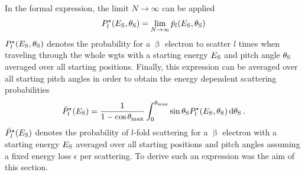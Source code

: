 In the formal expression, the limit $N\rightarrow\infty$ can be applied
\begin{equation}
  P^{\star}_l(E_\mathrm{S},\theta_\mathrm{S}) = 
    \lim_{N\rightarrow\infty} \bar{p}_l(E_\mathrm{S},\theta_\mathrm{S})
    \label{eq:appendixEDepScatCrossSecExtendedModelFormalismPitchAngleDepScatProbs}
\end{equation}
$P^{\star}_l(E_\mathrm{S},\theta_\mathrm{S})$ denotes the probability for a $\upbeta$ electron to scatter $l$ times when traveling through the whole \gls{wgts} with a starting energy $E_\mathrm{S}$ and pitch angle $\theta_\mathrm{S}$ averaged over all starting positions. Finally, this expression can be averaged over all starting pitch angles in order to obtain the energy dependent scattering probabilities
\begin{equation}
    \bar{P}^{\star}_l(E_\mathrm{S}) = 
    \frac{1}{1-\cos\theta_\mathrm{max}}
    \int_0^{\theta_\mathrm{max}}
    	\sin \theta_\mathrm{S}
        P^{\star}_l(E_\mathrm{S},\theta_\mathrm{S}) 
        \mathop{}\!\mathrm{d} \theta_\mathrm{S}
    \text{\,.}
    \label{eq:appendixEDepScatCrossSecExtendedModelFormalismAveragedDepScatProbs}
\end{equation}
$\bar{P}^{\star}_l(E_\mathrm{S})$ denotes the probability of $l$-fold scattering for a $\upbeta$ electron with a starting energy $E_\mathrm{S}$ averaged over all starting positions and pitch angles assuming a fixed energy loss $\epsilon$ per scattering. To derive such an expression was the aim of this section. 

